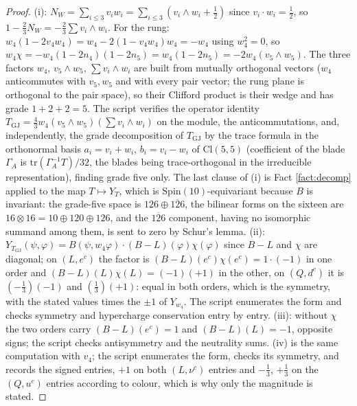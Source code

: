 \documentclass[11pt]{article}
\theoremstyle{definition}
\newcommand{\Cl}{\mathrm{Cl}}
\begin{document}
\begin{proof}
(i): $N_{W} = \sum_{i\le3} v_{i}w_{i} = \sum_{i\le3}(v_{i}\wedge w_{i} + \tfrac12)$ since $v_{i}\cdot w_{i} = \tfrac12$, so $1 - \tfrac23 N_{W} = -\tfrac23\sum v_{i}\wedge w_{i}$. For the rung: $w_{4}(1 - 2v_{4}w_{4}) = w_{4} - 2(1 - v_{4}w_{4})w_{4} = -w_{4}$ using $w_{4}^{2} = 0$, so $w_{4}\chi = -w_{4}(1 - 2n_{4})(1 - 2n_{5}) = w_{4}(1 - 2n_{5}) = -2w_{4}(v_{5}\wedge w_{5})$. The three factors $w_{4}$, $v_{5}\wedge w_{5}$, $\sum v_{i}\wedge w_{i}$ are built from mutually orthogonal vectors ($w_{4}$ anticommutes with $v_{5}, w_{5}$ and with every pair vector; the rung plane is orthogonal to the pair space), so their Clifford product is their wedge and has grade $1 + 2 + 2 = 5$. The script verifies the operator identity $T_{\mathrm{GJ}} = \tfrac43 w_{4}(v_{5}\wedge w_{5})(\sum v_{i}\wedge w_{i})$ on the module, the anticommutations, and, independently, the grade decomposition of $T_{\mathrm{GJ}}$ by the trace formula in the orthonormal basis $a_{i} = v_{i} + w_{i}$, $b_{i} = v_{i} - w_{i}$ of $\Cl(5,5)$ (coefficient of the blade $\Gamma_{A}$ is $\mathrm{tr}(\Gamma_{A}^{-1}T)/32$, the blades being trace-orthogonal in the irreducible representation), finding grade five only. The last clause of (i) is Fact \ref{fact:decomp} applied to the map $T \mapsto Y_{T}$, which is $\mathrm{Spin}(10)$-equivariant because $B$ is invariant: the grade-five space is $126 \oplus \overline{126}$, the bilinear forms on the sixteen are $16 \otimes 16 = 10 \oplus 120 \oplus 126$, and the $\overline{126}$ component, having no isomorphic summand among them, is sent to zero by Schur's lemma. (ii): $Y_{T_{\mathrm{GJ}}}(\psi, \varphi) = B(\psi, w_{4}\varphi)\cdot(B - L)(\varphi)\chi(\varphi)$ since $B - L$ and $\chi$ are diagonal; on $(L, e^{c})$ the factor is $(B-L)(e^{c})\chi(e^{c}) = 1\cdot(-1)$ in one order and $(B-L)(L)\chi(L) = (-1)(+1)$ in the other, on $(Q, d^{c})$ it is $(-\tfrac13)(-1)$ and $(\tfrac13)(+1)$: equal in both orders, which is the symmetry, with the stated values times the $\pm1$ of $Y_{w_{4}}$. The script enumerates the form and checks symmetry and hypercharge conservation entry by entry. (iii): without $\chi$ the two orders carry $(B-L)(e^{c}) = 1$ and $(B-L)(L) = -1$, opposite signs; the script checks antisymmetry and the neutrality sums. (iv) is the same computation with $v_{4}$; the script enumerates the form, checks its symmetry, and records the signed entries, $+1$ on both $(L, \nu^{c})$ entries and $-\tfrac13$, $+\tfrac13$ on the $(Q, u^{c})$ entries according to colour, which is why only the magnitude is stated.
\end{proof}
\end{document}
